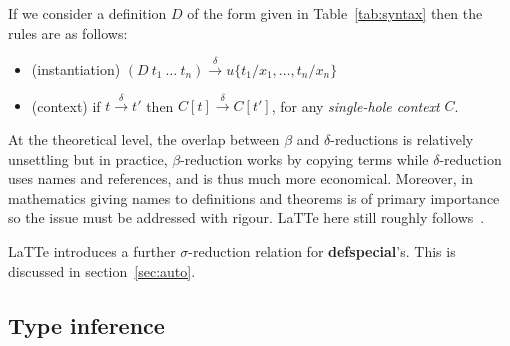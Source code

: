 \documentclass{styles/sig-alternate-05-2015}
\newcommand{\kw}[1]{\textbf{#1}}
\begin{document}
If we consider a definition $D$ of the form given in Table~\ref{tab:syntax} then the rules are as follows:
\begin{itemize}
\item (instantiation) $(D~t_1~\ldots~t_n) \xrightarrow{\delta} u \{t_1/x_1,\ldots,t_n/x_n\}$
\item (context) if $t\xrightarrow{\delta} t'$ then $C[t] \xrightarrow{\delta} C[t']$, for any \emph{single-hole context} $C$.
\end{itemize}
At the theoretical level, the overlap between $\beta$ and $\delta$-reductions is relatively unsettling but in practice,
$\beta$-reduction works by copying terms while $\delta$-reduction uses names and references, and is thus much more
economical. Moreover, in mathematics giving names to definitions and theorems is of primary importance so the issue
must be addressed with rigour. LaTTe here still roughly follows~\cite{book:type-theory2014}.

LaTTe introduces a further $\sigma$-reduction relation for \kw{defspecial}'s. This is discussed in section~\ref{sec:auto}.

\subsection{Type inference}
\end{document}
